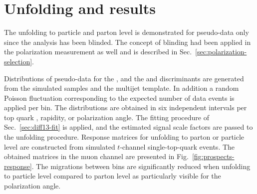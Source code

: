 
\section{Unfolding and results}

The unfolding to particle and parton level is demonstrated for pseudo-data only since the analysis has been blinded. The concept of blinding had been applied in the polarization measurement as well and is described in Sec.~\ref{sec:polarization-selection}.

Distributions of pseudo-data for the \mtw, and the \bdttt and \bdttch discriminants are generated from the simulated samples and the multijet template. In addition a random Poisson fluctuation corresponding to the expected number of data events is applied per bin. The distributions are obtained in six independent intervals per top quark \pt, rapidity, or polarization angle. The fitting procedure of Sec.~\ref{sec:diff13-fit} is applied, and the estimated signal scale factors are passed to the unfolding procedure. Response matrices for unfolding to parton or particle level are constructed from simulated $t$-channel single-top-quark events. The obtained matrices in the muon channel are presented in Fig.~\ref{fig:prospects-response}. The migrations between bins are significantly reduced when unfolding to particle level compared to parton level as particularly visible for the polarization angle.

